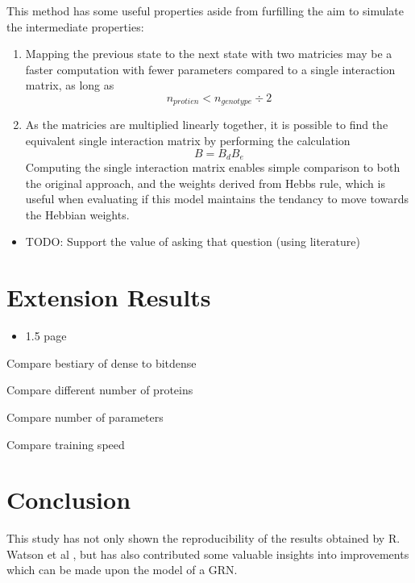 \documentclass[twocolumn,a4paper]{article}
\begin{document}
    This method has some useful properties aside from furfilling the aim to simulate the intermediate properties:
    \begin{enumerate}
        \item Mapping the previous state to the next state with two matricies may be a faster computation with fewer parameters compared to a single interaction matrix, as long as
        \begin{equation}
            n_{protien} < n_{genotype} \div 2
        \end{equation}
            
        \item As the matricies are multiplied linearly together, it is possible to find the equivalent single interaction matrix by performing the calculation
        \begin{equation}
            B = B_dB_e
        \end{equation}
        Computing the single interaction matrix enables simple comparison to both the original approach, and the weights derived from Hebbs rule, which is useful when evaluating if this model maintains the tendancy to move towards the Hebbian weights.
    \end{enumerate}
    \begin{itemize}
        \item TODO: Support the value of asking that question (using literature)
    \end{itemize}


    \section{Extension Results}
    \begin{itemize}
        \item 1.5 page
    \end{itemize}

    Compare bestiary of dense to bitdense

    Compare different number of proteins

    Compare number of parameters

    Compare training speed


    \section{Conclusion}
    This study has not only shown the reproducibility of the results obtained by R. Watson et al \cite{rich}, but has also contributed some valuable insights into improvements which can be made upon the model of a GRN.
\end{document}
